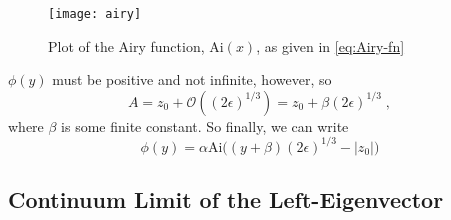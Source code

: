 \documentclass[a4paper,10pt]{article}
\newcommand{\Or}{\mathcal{O}}
\newcommand{\Ai}{\mathrm{Ai}}
\begin{document}
\begin{figure}[h!]
  \centering
  \texttt{[image: airy]}
  \caption{Plot of the Airy function, $\Ai(x)$, as given in \eqref{eq:Airy-fn}}
  \label{fig:Airy-fn}
\end{figure}
$\phi(y)$ must be positive and not infinite, however, so
\begin{equation}
  A = z_0 + \Or( (2\epsilon)^{1/3} )  = z_0 + \beta (2\epsilon)^{1/3} \;,
\end{equation}
where $\beta$ is some finite constant. So finally, we can write
\begin{equation}
  \phi(y) = \alpha \Ai \bigg( (y+\beta)(2\epsilon)^{1/3} - |z_0| \bigg)
\end{equation}


\subsection{Continuum Limit of the Left-Eigenvector}
\end{document}

